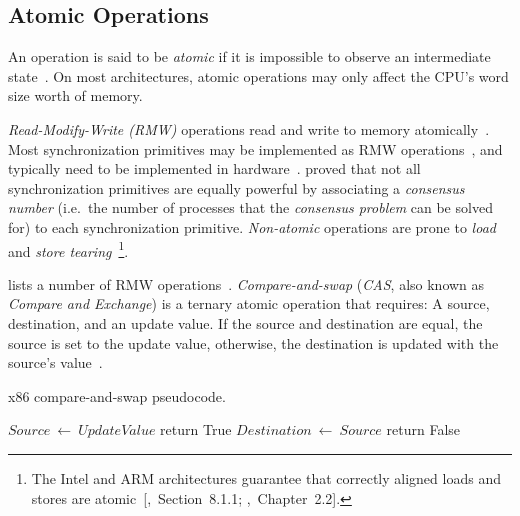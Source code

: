 \subsection{Atomic Operations}
An operation is said to be \emph{atomic} if it is impossible to observe an
intermediate state~\citep{perfbook2021}. On most architectures, atomic
operations may only affect the CPU's word size worth of memory.

\emph{Read-Modify-Write (RMW)} operations read and write to memory
atomically~\citep{perfbook2021}. Most synchronization primitives may be
implemented as RMW operations~\citep[Section~5.6]{herlihy2020art}, and
typically need to be implemented in hardware~\citep[Appendix~B.8]{herlihy2020art}.
\citeauthor{herlihy1991wait} proved that not all synchronization primitives are
equally powerful by associating a \emph{consensus number} (i.e.~the number of
processes that the \emph{consensus problem} can be solved for) to each
synchronization primitive. \emph{Non-atomic} operations are prone to \emph{load} and \emph{store
tearing}~\citep[Section~4.3.4]{perfbook2021}\footnote{The Intel and ARM
architectures guarantee that correctly aligned loads and stores are
atomic~[\citealp{intel2021system},~Section~8.1.1;
\citealp{arm2022architecture},~Chapter~2.2].}.

\citeauthor{scott2013shared} lists a number of RMW operations~\citep[Table~2.2]{scott2013shared}.
\emph{Compare-and-swap} (\emph{CAS}, also known as \emph{Compare and Exchange})
is a ternary atomic operation that requires: A source, destination, and an
update value. If the source and destination are equal, the source is set to the
update value, otherwise, the destination is updated with the source's
value~\citep{intel2021inst}.

\begin{algorithm}
    \caption{x86 compare-and-swap pseudocode.}\label{alg:cas}
    \begin{algorithmic}[1]
                \State $Source~\gets~UpdateValue$
                \State return True
            \EndIf
            \State $Destination~\gets~Source$ \label{alg:line:sourceneqdest}
            \State return False
        \EndFunction
    \end{algorithmic}
\end{algorithm}

